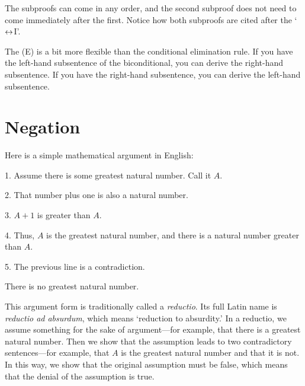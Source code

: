 The subproofs can come in any order, and the second subproof does not need to come immediately after the first. Notice how both subproofs are cited after the `$\leftrightarrow$I'.

The  ({\eiff}E) is a bit more flexible than the conditional elimination rule. If you have the left-hand subsentence of the biconditional, you can derive the right-hand subsentence. If you have the right-hand subsentence, you can derive the left-hand subsentence.
\factoidbox{
\begin{proof}
	\have[m]{ab}{\meta{A}\eiff\meta{B}}
	\have[n]{a}{\meta{A}}
	\have[\ ]{b}{\meta{B}} \be{ab,a}
\end{proof}
\begin{proof}
	\have[m]{ab}{\meta{A}\eiff\meta{B}}
	\have[n]{a}{\meta{B}}
	\have[\ ]{b}{\meta{A}} \be{ab,a}
\end{proof}}


\section{Negation}
Here is a simple mathematical argument in English:
\begin{earg}
\item[1.] Assume there is some greatest natural number. Call it $A$.
\item[2.] That number plus one is also a natural number.
\item[3.] $A+1$ is greater than $A$.
\item[4.] Thus, $A$ is the greatest natural number, and there is a natural number greater than $A$.
\item[5.] The previous line is a contradiction.
\item[\therefore] There is no greatest natural number.
\end{earg}
This argument form is traditionally called a \emph{reductio}. Its full Latin name is \emph{reductio ad absurdum}, which means `reduction to absurdity.' In a reductio, we assume something for the sake of argument---for example, that there is a greatest natural number. Then we show that the assumption leads to two contradictory sentences---for example, that $A$ is the greatest natural number and that it is not. In this way, we show that the original assumption must be false, which means that the denial of the assumption is true. 

